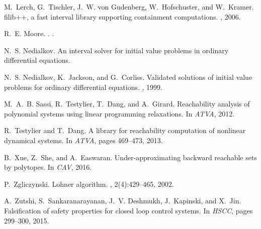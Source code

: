 \documentclass{sig-alternate-05-2015}
\begin{document}
\begin{thebibliography}{10}
M.~Lerch, G.~Tischler, J.~W. von Gudenberg, W.~Hofschuster, and W.~Kramer.
\newblock filib++, a fast interval library supporting containment computations.
, 2006.

R.~E. Moore.
.
.

N.~S. Nedialkov.
\newblock An interval solver for initial value problems in ordinary
  differential equations.

N.~S. Nedialkov, K.~Jackson, and G.~Corliss.
\newblock Validated solutions of initial value problems for ordinary
  differential equations.
, 1999.

M.~A.~B. Sassi, R.~Testylier, T.~Dang, and A.~Girard.
\newblock Reachability analysis of polynomial systems using linear programming
  relaxations.
\newblock In {\em ATVA}, 2012.

R.~Testylier and T.~Dang.
 {A} library for reachability computation of nonlinear
  dynamical systems.
\newblock In {\em ATVA}, pages 469--473, 2013.

B.~Xue, Z.~She, and A.~Easwaran.
\newblock Under-approximating backward reachable sets by polytopes.
\newblock In {\em CAV}, 2016.

P.~Zgliczynski.
 {L}ohner algorithm.
, 2(4):429--465, 2002.

A.~Zutshi, S.~Sankaranarayanan, J.~V. Deshmukh, J.~Kapinski, and X.~Jin.
\newblock Falsification of safety properties for closed loop control systems.
\newblock In {\em HSCC}, pages 299--300, 2015.

\end{thebibliography}
\end{document}
